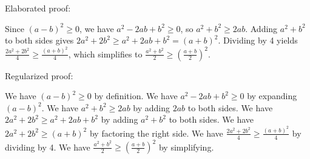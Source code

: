 \documentclass{article}
\begin{document}
Elaborated proof:
\begin{tcolorbox}[colback=green!10, width=\linewidth]
Since $(a-b)^2 \ge 0$, we have $a^2 - 2ab + b^2 \ge 0$, so $a^2 + b^2 \ge 2ab$.  Adding $a^2 + b^2$ to both sides gives $2a^2 + 2b^2 \ge a^2 + 2ab + b^2 = (a+b)^2$. Dividing by 4 yields $\frac{2a^2 + 2b^2}{4} \ge \frac{(a+b)^2}{4}$, which simplifies to $\frac{a^2+b^2}{2} \ge \left(\frac{a+b}{2}\right)^2$.
\end{tcolorbox}

Regularized proof:
\begin{tcolorbox}[colback=red!10, width=\linewidth]
We have $(a-b)^2 \ge 0$ by definition. We have $a^2 - 2ab + b^2 \ge 0$ by expanding $(a-b)^2$. We have $a^2 + b^2 \ge 2ab$ by adding $2ab$ to both sides. We have $2a^2 + 2b^2 \ge a^2 + 2ab + b^2$ by adding $a^2 + b^2$ to both sides. We have $2a^2 + 2b^2 \ge (a+b)^2$ by factoring the right side. We have $\frac{2a^2 + 2b^2}{4} \ge \frac{(a+b)^2}{4}$ by dividing by 4. We have $\frac{a^2+b^2}{2} \ge \left(\frac{a+b}{2}\right)^2$ by simplifying.
\end{tcolorbox}
\end{document}
